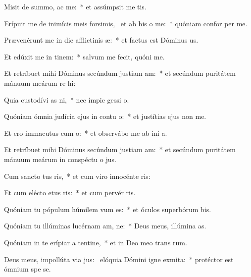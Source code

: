 \item Misit de summo,  ac me:~* et assúmpsit me   tis.
\item Erípuit me de inimícis meis forsimis,~\pscross{} et ab his  o me:~* quóniam confor  per me.
\item Prævenérunt me in die afflictinis æ:~* et factus est Dóminus  us.
\item Et edúxit me in tinem:~* salvum me fecit, quóni  me.
\item Et retríbuet mihi Dóminus secúndum justiam am:~* et secúndum puritátem mánuum meárum re hi:
\item Quia custodívi as ni,~* nec ímpie gessi   o.
\item Quóniam ómnia judícia ejus in contu o:~* et justítias ejus non   me.
\item Et ero immacutus cum o:~* et observábo me ab ini a.
\item Et retríbuet mihi Dóminus secúndum justiam am:~* et secúndum puritátem mánuum meárum in conspéctu o jus.
\item Cum sancto tus ris,~* et cum viro innocénte  ris:
\item Et cum elécto etus ris:~* et cum pervér ris.
\item Quóniam tu pópulum húmilem vum es:~* et óculos superbórum bis.
\item Quóniam tu illúminas lucérnam am, ne:~* Deus meus, illúmina  as.
\item Quóniam in te erípiar a tentine,~* et in Deo meo trans rum.
\item Deus meus, impollúta via jus:~\pscross{} elóquia Dómini igne exmita:~* protéctor est ómnium spe  se.
